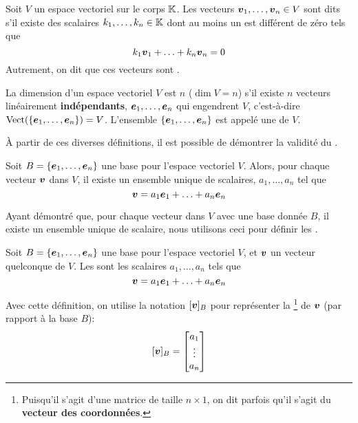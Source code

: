 \begin{defini}
Soit $V$ un espace vectoriel sur le corps $\mathbb{K}$. 
Les vecteurs $\boldsymbol{v}_1, \ldots, \boldsymbol{v}_n \in V$ sont dits  s'il existe des scalaires
$k_1, \ldots, k_n \in \mathbb{K}$ dont au moins un est différent de zéro tels que
\[
k_1 \boldsymbol{v}_1 + \ldots + k_n \boldsymbol{v}_n = 0
\]
Autrement, on dit que ces vecteurs sont .
\end{defini}

\begin{defini}
La dimension d'un espace vectoriel $V$ est $n$ ($\dim V = n$) s'il existe $n$ vecteurs linéairement \textbf{indépendants},
$\boldsymbol{e}_1, \ldots, \boldsymbol{e}_n$ qui engendrent $V$, c'est-à-dire $\operatorname{Vect}(\{\boldsymbol{e}_1, \ldots, \boldsymbol{e}_n\}) = V$.
L'ensemble $\{\boldsymbol{e}_1, \ldots, \boldsymbol{e}_n\}$ est appelé une  de $V$.
\end{defini}

À partir de ces diverses définitions, il est possible de démontrer la validité du
.
\begin{theo}
Soit $B = \{\boldsymbol{e}_1, \ldots, \boldsymbol{e}_n\}$ une base pour l'espace vectoriel $V$. 
Alors, pour chaque vecteur $\boldsymbol{v}$ dans $V$, il existe un ensemble unique de
scalaires, $a_1, \ldots, a_n$ tel que 
\[
\boldsymbol{v} = a_1 \boldsymbol{e}_1 + \ldots + a_n \boldsymbol{e}_n
\]
\end{theo}
Ayant démontré que, pour chaque vecteur dans $V$ avec une base donnée $B$,
il existe un ensemble unique de scalaire, nous utilisons ceci pour définir
les .
\begin{defini}
Soit $B = \{\boldsymbol{e}_1, \ldots, \boldsymbol{e}_n\}$ une base pour l'espace vectoriel $V$, 
et $\boldsymbol{v}$ un vecteur quelconque de $V$.
Les  sont les scalaires
$a_1, \ldots, a_n$ tels que
\[
\boldsymbol{v} = a_1 \boldsymbol{e}_1 + \ldots + a_n \boldsymbol{e}_n
\]
\end{defini}
Avec cette définition, on utilise la notation $[\boldsymbol{v}]_B$ pour représenter la
\footnote{Puisqu'il s'agit d'une matrice de taille $n\times 1$,
on dit parfois qu'il s'agit du \textbf{vecteur des coordonnées}.} de $\boldsymbol{v}$ (par rapport à la base $B$):
\[
[\boldsymbol{v}]_B = \begin{bmatrix}
a_1 \\
\vdots \\
a_n
\end{bmatrix}
\]


